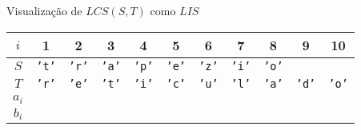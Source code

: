 \begin{frame}[fragile]{Visualização de $LCS(S, T)$ como $LIS$}

    \begin{table}
        \centering

        \begin{tabular}{c|cccccccccc} 
        \hline 
        $i$ & 1 & 2 & 3 & 4 & 5 & 6 & 7 & 8 & 9 & 10\\
        \hline
        $S$
        & \textcolor{blue!80!black}{\texttt{'t'}}
        & \textcolor{blue!80!black}{\texttt{'r'}}
        & \textcolor{blue!80!black}{\texttt{'a'}}
        & \textcolor{blue!80!black}{\texttt{'p'}}
        & \textcolor{blue!80!black}{\texttt{'e'}}
        & \textcolor{blue!80!black}{\texttt{'z'}}
        & \textcolor{blue!80!black}{\texttt{'i'}}
        & \textcolor{blue!80!black}{\texttt{'o'}} \\
        $T$
        & \textcolor{green!50!black}{\texttt{'r'}}
        & \textcolor{green!50!black}{\texttt{'e'}}
        & \textcolor{green!50!black}{\texttt{'t'}}
        & \textcolor{green!50!black}{\texttt{'i'}}
        & \textcolor{green!50!black}{\texttt{'c'}}
        & \textcolor{green!50!black}{\texttt{'u'}}
        & \textcolor{green!50!black}{\texttt{'l'}}
        & \textcolor{green!50!black}{\texttt{'a'}}
        & \textcolor{green!50!black}{\texttt{'d'}}
        & \textcolor{green!50!black}{\texttt{'o'}} \\
        $a_i$ \\
        $b_i$ \\
        \hline
        \end{tabular}

    \end{table}

\end{frame}

